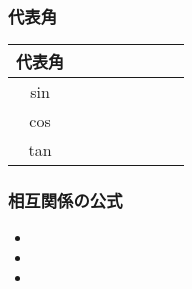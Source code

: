 \documentclass[10pt,dvipdfmx]{jsarticle}
\begin{document}
\subsubsection*{代表角}
{\renewcommand\arraystretch{2}
  \begin{table}[H]
    \begin{tabular}{|c||p{1.5cm}|p{1.5cm}|p{1.5cm}|p{1.5cm}|p{1.5cm}|p{1.5cm}|p{1.5cm}|}
      \hline
      代表角 &  &  &  &  &  &  & \\
      \hline
      sin    &  &  &  &  &  &  & \\
      \hline
      cos    &  &  &  &  &  &  & \\
      \hline
      tan    &  &  &  &  &  &  & \\
      \hline
    \end{tabular}
  \end{table}
}

\subsubsection*{相互関係の公式}
\begin{multicols}{3}
  \begin{LARGE}
    \begin{itemize}
      \item
      \item
      \item
    \end{itemize}
  \end{LARGE}
\end{multicols}
\end{document}
